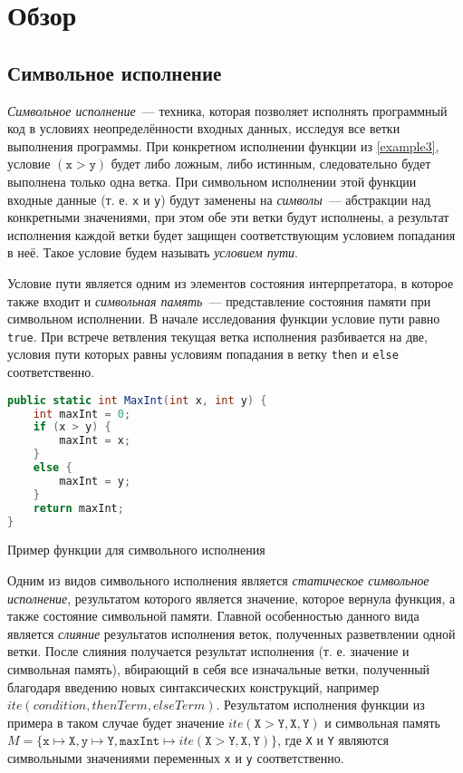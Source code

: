 \section{Обзор}


\subsection{Символьное исполнение}\label{symbolicExec}
\emph{Символьное исполнение}~--- техника, которая позволяет исполнять программный код в условиях неопределённости входных данных, исследуя все ветки выполнения программы. При конкретном исполнении функции из \autoref{example3}, условие $(\texttt{x} > \texttt{y})$ будет либо ложным, либо истинным, следовательно будет выполнена только одна ветка. При символьном исполнении этой функции входные данные (т. е. \texttt{x} и \texttt{y}) будут заменены на \emph{символы}~--- абстракции над конкретными значениями, при этом обе эти ветки будут исполнены, а результат исполнения каждой ветки будет защищен соответствующим условием попадания в неё. Такое условие будем называть \emph{условием пути}.

Условие пути является одним из элементов состояния интерпретатора, в которое также входит и \emph{символьная память}~--- представление состояния памяти при символьном исполнении. В начале исследования функции условие пути равно \texttt{true}. При встрече ветвления текущая ветка исполнения разбивается на две, условия пути которых равны условиям попадания в ветку \texttt{then} и \texttt{else} соответственно.

\begin{listing}[H]
\begin{lstlisting}[language=csharp]
public static int MaxInt(int x, int y) {
    int maxInt = 0;
    if (x > y) {
        maxInt = x;
    }
    else {
        maxInt = y;
    }
    return maxInt;
}
\end{lstlisting}
\caption{Пример функции для символьного исполнения}
\label{example3}
\end{listing}

Одним из видов символьного исполнения является \emph{статическое символьное исполнение}, результатом которого является значение, которое вернула функция, а также состояние символьной памяти. Главной особенностью данного вида является \emph{слияние} результатов исполнения веток, полученных разветвлении одной ветки. После слияния получается результат исполнения (т. е. значение и символьная память), вбирающий в себя все изначальные ветки, полученный благодаря введению новых синтаксических конструкций, например $ite(condition, thenTerm, elseTerm)$. Результатом исполнения функции из примера в таком случае будет значение $ite(\texttt{X} > \texttt{Y}, \texttt{X}, \texttt{Y})$ и символьная память $M=\{ \texttt{x}\mapsto \texttt{X}, \texttt{y}\mapsto \texttt{Y}, \texttt{maxInt}\mapsto ite(\texttt{X} > \texttt{Y}, \texttt{X}, \texttt{Y}) \}$, где \texttt{X} и \texttt{Y} являются символьными значениями переменных \texttt{x} и \texttt{y} соответственно. 

